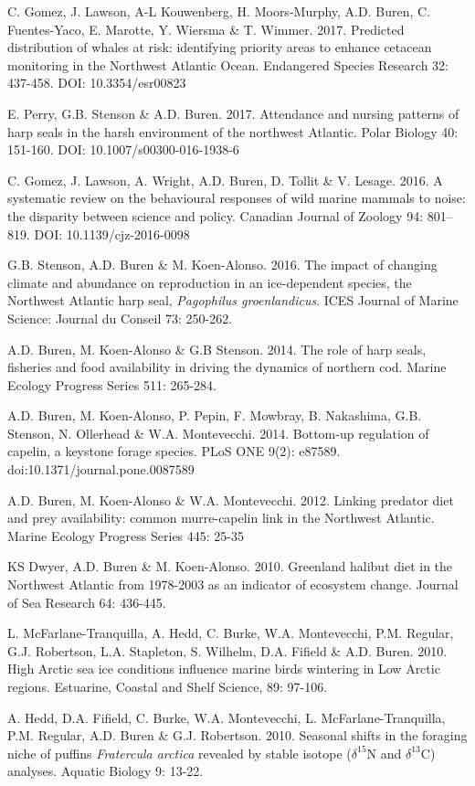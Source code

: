 \documentclass{res}
\begin{document}
\begin{resume}
\begin{hangparas}{.4in}{1}
C. Gomez,  J. Lawson, A-L Kouwenberg, H. Moors-Murphy, A.D. Buren, C. Fuentes-Yaco, E.  Marotte, Y. Wiersma \& T. Wimmer. 2017. Predicted distribution of whales at risk: identifying priority areas to enhance cetacean monitoring in the Northwest Atlantic Ocean. Endangered Species Research 32: 437-458. DOI: 10.3354/esr00823

E. Perry, G.B. Stenson \& A.D. Buren. 2017. Attendance and nursing patterns of harp seals in the harsh environment of the northwest Atlantic. Polar Biology 40: 151-160. DOI: 10.1007/s00300-016-1938-6

C. Gomez, J. Lawson, A. Wright, A.D. Buren, D. Tollit \& V. Lesage. 2016. A systematic review on the behavioural responses of wild marine mammals to noise: the disparity between science and policy. Canadian Journal of Zoology 94: 801–819. DOI: 10.1139/cjz-2016-0098

G.B. Stenson, A.D. Buren \& M. Koen-Alonso. 2016. The impact of changing climate and abundance on reproduction in an ice-dependent species, the Northwest Atlantic harp seal, \textit{Pagophilus groenlandicus}. ICES Journal of Marine Science: Journal du Conseil 73: 250-262.

A.D. Buren, M. Koen-Alonso \& G.B Stenson. 2014. The role of harp seals, fisheries and food availability in driving the dynamics of northern cod. Marine Ecology Progress Series 511: 265-284.

A.D. Buren, M. Koen-Alonso, P. Pepin, F. Mowbray, B. Nakashima, G.B. Stenson, N. Ollerhead \& W.A. Montevecchi. 2014. Bottom-up regulation of capelin, a keystone forage species. PLoS ONE 9(2): e87589. doi:10.1371/journal.pone.0087589

A.D. Buren, M. Koen-Alonso \& W.A. Montevecchi. 2012. Linking predator diet and prey availability: common murre-capelin link in the Northwest Atlantic. Marine Ecology Progress Series 445: 25-35

KS Dwyer, A.D. Buren \& M. Koen-Alonso. 2010. Greenland halibut diet in the Northwest Atlantic from 1978-2003 as an indicator of ecosystem change. Journal of Sea Research 64: 436-445. 

L. McFarlane-Tranquilla, A. Hedd, C. Burke, W.A. Montevecchi, P.M. Regular, G.J. Robertson, L.A. Stapleton, S. Wilhelm, D.A. Fifield \& A.D. Buren. 2010. High Arctic sea ice conditions influence marine birds wintering in Low Arctic regions. Estuarine, Coastal and Shelf Science, 89: 97-106.

A. Hedd, D.A. Fifield, C. Burke, W.A. Montevecchi, L. McFarlane-Tranquilla, P.M. Regular, A.D. Buren \& G.J. Robertson. 2010. Seasonal shifts in the foraging niche of puffins \textit{Fratercula arctica} revealed by stable isotope ($\delta^{15}$N and $\delta^{13}$C) analyses. Aquatic Biology 9: 13-22.


\end{hangparas}
\end{resume}
\end{document}

